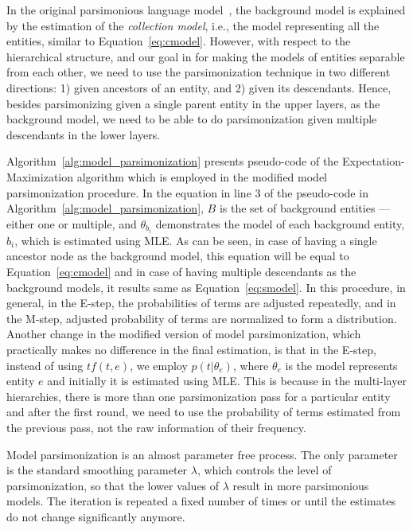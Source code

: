 In the original parsimonious language model~\citep{Hiemstra:2004}, the background model is explained by the estimation of the \emph{collection model}, i.e., the model representing all the entities, similar to Equation~\ref{eq:cmodel}.  
However, with respect to the hierarchical structure, and our goal in \achswlm for making the models of entities separable from each other, we need to use the parsimonization technique in two different directions: 1) given ancestors of an entity, and 2) given its descendants. Hence, besides parsimonizing given a single parent entity in the upper layers, as the background model, we need to be able to do parsimonization given multiple descendants in the lower layers. 

Algorithm~\ref{alg:model_parsimonization} presents pseudo-code of the Expectation-Maximization algorithm which is employed in the modified model parsimonization procedure. 
In the equation in line 3 of the pseudo-code in Algorithm~\ref{alg:model_parsimonization}, $B$ is the set of background entities ---either one or multiple, and $\theta_{b_i}$ demonstrates the model of each background entity, $b_i$, which is estimated using MLE. As can be seen, in case of having a single ancestor node as the background model,  this equation will be equal to Equation~\ref{eq:cmodel} and in case of having multiple descendants as the background models, it results same as Equation~\ref{eq:smodel}. 
In this procedure, in general, in the E-step, the probabilities of terms are adjusted repeatedly, and in the M-step, adjusted probability of terms are normalized to form a distribution. 
Another change in the modified version of model parsimonization, which practically makes no difference in the final estimation, is that in the E-step, instead of using $tf(t,e)$, we employ $p(t|\theta_e)$, where $\theta_e$ is the model represents entity $e$ and initially it is estimated using MLE. This is because in the multi-layer hierarchies, there is more than one parsimonization pass for a particular entity and after the first round, we need to use the probability of terms estimated from the previous pass, not the raw information of their frequency.


Model parsimonization is an almost parameter free process. The only parameter is the standard smoothing parameter $\lambda$, which controls the level of parsimonization, so that the lower values of $\lambda$ result in more parsimonious models.
The iteration is repeated a fixed number of times or until the estimates do not change significantly anymore. 


